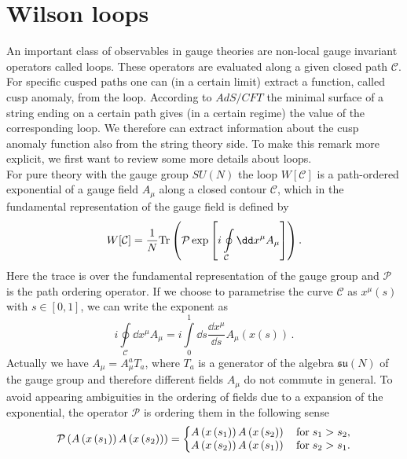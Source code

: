\section{Wilson loops}
%
An important class of observables in gauge theories are non-local gauge invariant operators called  loops. These operators are evaluated along a given closed path $\mathcal{C}$. For specific cusped paths one can (in a certain limit) extract a function, called cusp anomaly, from the  loop. According to $AdS/CFT$ the minimal surface of a string ending on a certain path gives (in a certain regime) the value of the corresponding  loop. We therefore can extract information about the cusp anomaly function also from the string theory side. To make this remark more explicit, we first want to review some more details about  loops.\\
For pure  theory with the gauge group $SU(N)$ the  loop $W[\mathcal{C}]$ is a path-ordered exponential of a gauge field $A_{\mu}$ along a closed contour $\mathcal{C}$, which in the fundamental representation of the gauge field is defined by
%
%
\begin{equation}
W[\mathcal{C}] = \frac{1}{N}{\rm Tr} \left( \mathcal{P} \exp \left[ i \oint\limits_{\mathcal{C}} \dd x^{\mu}A_{\mu} \right] \right).
\end{equation}
%
%
Here the trace is over the fundamental representation of the gauge group and $\mathcal{P}$ is the path ordering operator. If we choose to parametrise the curve $\mathcal{C}$ as $x^{\mu}(s)$ with $s \in [0,1]$, we can write the exponent as
\begin{equation}
 i \oint\limits_{\mathcal{C}} \dd x^{\mu}A_{\mu} =  i \int\limits_{0}^{1} \dd s \frac{\dd x^{\mu}}{\dd s} A_{\mu}\left(x\left(s \right)\right)\,.
\end{equation}
Actually we have $A_{\mu}=A_{\mu}^{a}T_{a}$, where $T_{a}$ is a generator of the  algebra $\mathfrak{su}(N)$ of the gauge group and therefore different fields $A_{\mu}$ do not commute in general. To avoid appearing ambiguities in the ordering of fields due to a  expansion of the exponential, the operator $\mathcal{P}$ is ordering them in the following sense
\begin{equation}
\mathcal{P}\left( A\left(x\left(s_{1}\right)\right) A\left(x\left(s_{2}\right)\right) \right)
= \left\lbrace \begin{matrix}
A\left(x\left(s_{1}\right)\right) A\left(x\left(s_{2}\right)\right) \quad {\rm for} \; s_{1}>s_{2},  \\
A\left(x\left(s_{2}\right)\right) A\left(x\left(s_{1}\right)\right) \quad {\rm for} \; s_{2}>s_{1}.
\end{matrix} \right.
\end{equation}
%
%
%
